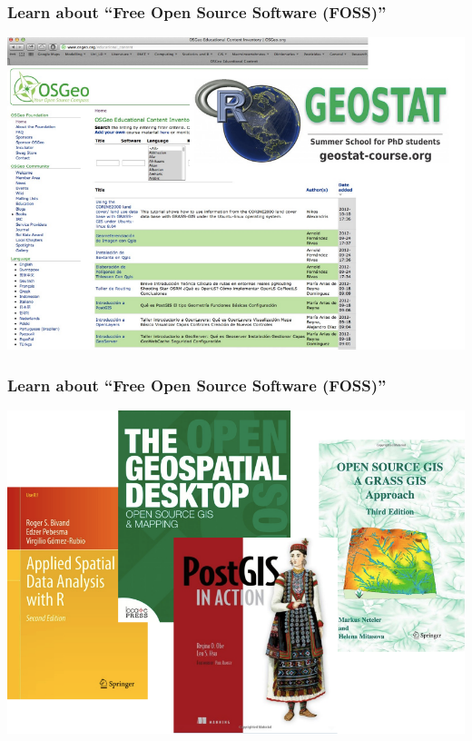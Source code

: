 \documentclass{beamer}
\begin{document}

\begin{frame}
\frametitle{Learn about ``Free Open Source Software (FOSS)''}
\centering
\includegraphics[width=\textwidth]{Figures/FOSS_ed.png}
\end{frame}


\begin{frame}
\frametitle{Learn about ``Free Open Source Software (FOSS)''}
\centering
\includegraphics[width=\textwidth]{Figures/FOSS_books.png}
\end{frame}

\end{document}
